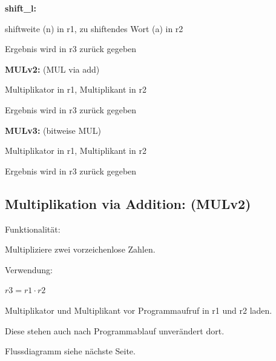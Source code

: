 \documentclass[fleqn, a4paper, 11pt]{article}       %
\begin{document}
  \vspace{0.2cm}

 \noindent \textbf{shift\_l:}
 \begin{compactitem}
     \item shiftweite (n) in r1, zu shiftendes Wort (a) in r2
     \item Ergebnis wird in r3 zurück gegeben
     \end{compactitem}
  
   \vspace{0.25cm}

 \noindent \textbf{MULv2:}  (MUL via add)
 \begin{compactitem}
     \item Multiplikator in r1, Multiplikant in r2
     \item Ergebnis wird in r3 zurück gegeben
     \end{compactitem}
   
    \vspace{0.25cm}

 \noindent \textbf{MULv3:}  (bitweise MUL)
 \begin{compactitem}
     \item Multiplikator in r1, Multiplikant in r2
     \item Ergebnis wird in r3 zurück gegeben
     \end{compactitem}


\newpage

\subsection{Multiplikation via Addition: (MULv2)\label{A.MULv2}}
Funktionalität: 

Multipliziere zwei vorzeichenlose Zahlen.
\vspace{0.25cm}

\noindent Verwendung:
\begin{compactitem}
    \item $r3 = r1 \cdot r2$
	\item Multiplikator und Multiplikant vor Programmaufruf  in r1  und r2 laden.
	\item Diese stehen auch nach Programmablauf unverändert   dort.
\end{compactitem}
\vspace{0.25cm}
\noindent Flussdiagramm siehe nächste Seite.

\thispagestyle{empty}


\newpage
\end{document}
